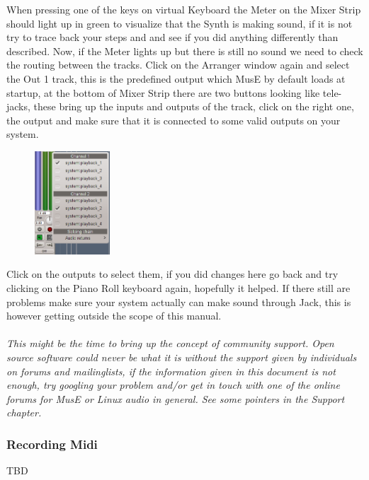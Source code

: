 \documentclass[a4paper]{report}
\begin{document}
When pressing one of the keys on virtual Keyboard the Meter on the Mixer
Strip should light up in green to visualize that the Synth is making
sound, if it is not try to trace back your steps and and see if you did
anything differently than described.
Now, if the Meter lights up but there is still no sound we need to
check the routing between the tracks. Click on the Arranger window again
and select the Out 1 track, this is the predefined output which MusE by
default loads at startup, at the bottom of Mixer Strip there are two
buttons looking like tele- jacks, these bring up the inputs and outputs
of the track, click on the right one, the output and make sure that it is
connected to some valid outputs on your system.
\begin{figure}
\includegraphics[width=0.25\textwidth]{pics/output_routing} 
\end{figure}
Click on the outputs to select them, if you did changes here go back and
try clicking on the Piano Roll keyboard again, hopefully it helped. If there
still are problems make sure your system actually can make sound through
Jack, this is however getting outside the scope of this manual.\\\\
\textit{This might be the time to bring up the concept of community support.
Open source software could never be what it is without the support given by
individuals on forums and mailinglists, if the information given in this
document is not enough, try googling your problem and/or get in touch with
one of the online forums for MusE or Linux audio in general. See some pointers
in the Support chapter.}


\subsubsection{Recording Midi}                                                %
TBD
\end{document}
